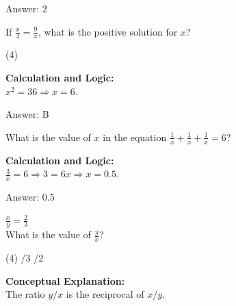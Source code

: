 \documentclass[11pt,paper=a4,answers]{exam}
\begin{document}
\begin{questions}
\begin{solution}
\vspace{30pt}

Answer: \colorbox{yellow!100}{2}
\end{solution}

\vspace{40pt}

\question
If $\frac{x}{4} = \frac{9}{x}$, what is the positive solution for $x$?
\begin{tasks}(4)
\end{tasks}

\begin{solution}
\textbf{Calculation and Logic:} \\
$x^2 = 36 \Rightarrow x = 6$.

\vspace{30pt}

Answer: \colorbox{yellow!100}{B}
\end{solution}

\vspace{40pt}

\question
What is the value of $x$ in the equation $\frac{1}{x} + \frac{1}{x} + \frac{1}{x} = 6$?

\begin{solution}
\textbf{Calculation and Logic:} \\
$\frac{3}{x} = 6 \Rightarrow 3 = 6x \Rightarrow x = 0.5$.

\vspace{30pt}

Answer: \colorbox{yellow!100}{0.5}
\end{solution}

\vspace{40pt}

\question
$\frac{x}{y} = \frac{2}{3}$ \\
What is the value of $\frac{y}{x}$?
\begin{tasks}(4)
    /3
    /2
\end{tasks}

\begin{solution}
\textbf{Conceptual Explanation:} \\
The ratio $y/x$ is the reciprocal of $x/y$.


\end{solution}
\end{questions}
\end{document}
